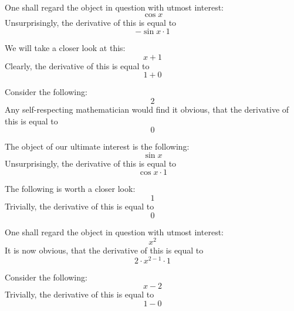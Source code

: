 \documentclass{article}
\begin{document}
One shall regard the object in question with utmost interest:
\begin{equation}
\cos x 
\end{equation}
Unsurprisingly, the derivative of this is equal to
\begin{equation}
-\sin x \cdot 1 
\end{equation}

We will take a closer look at this:
\begin{equation}
x + 1 
\end{equation}
Clearly, the derivative of this is equal to
\begin{equation}
1 + 0 
\end{equation}

Consider the following:
\begin{equation}
2 
\end{equation}
Any self-respecting mathematician would find it obvious, that the derivative of this is equal to
\begin{equation}
0 
\end{equation}

The object of our ultimate interest is the following:
\begin{equation}
\sin x 
\end{equation}
Unsurprisingly, the derivative of this is equal to
\begin{equation}
\cos x \cdot 1 
\end{equation}

The following is worth a closer look:
\begin{equation}
1 
\end{equation}
Trivially, the derivative of this is equal to
\begin{equation}
0 
\end{equation}

One shall regard the object in question with utmost interest:
\begin{equation}
x ^{2 } 
\end{equation}
It is now obvious, that the derivative of this is equal to
\begin{equation}
2 \cdot x ^{2 - 1 } \cdot 1 
\end{equation}

Consider the following:
\begin{equation}
x - 2 
\end{equation}
Trivially, the derivative of this is equal to
\begin{equation}
1 - 0 
\end{equation}
\end{document}
